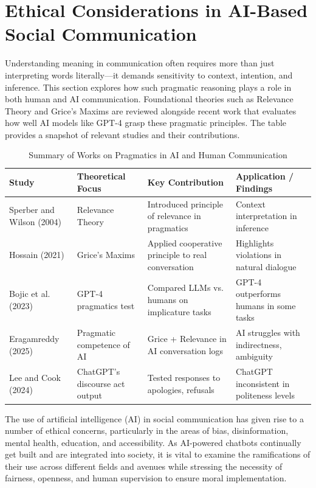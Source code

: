 \section{Ethical Considerations in AI-Based Social Communication}

Understanding meaning in communication often requires more than just interpreting words literally—it demands sensitivity to context, intention, and inference. This section explores how such pragmatic reasoning plays a role in both human and AI communication. Foundational theories such as Relevance Theory and Grice’s Maxims are reviewed alongside recent work that evaluates how well AI models like GPT-4 grasp these pragmatic principles. The table provides a snapshot of relevant studies and their contributions.

\begin{table}[H]
\centering
\caption{Summary of Works on Pragmatics in AI and Human Communication}
\small
\begin{tabular}{p{3.3cm} p{3.7cm} p{3.7cm} p{3.7cm}}
\toprule
\textbf{Study} & \textbf{Theoretical Focus} & \textbf{Key Contribution} & \textbf{Application / Findings} \\
\midrule
Sperber and Wilson (2004) & Relevance Theory & Introduced principle of relevance in pragmatics & Context interpretation in inference \\
Hossain (2021) & Grice's Maxims & Applied cooperative principle to real conversation & Highlights violations in natural dialogue \\
Bojic et al. (2023) & GPT-4 pragmatics test & Compared LLMs vs. humans on implicature tasks & GPT-4 outperforms humans in some tasks \\
Eragamreddy (2025) & Pragmatic competence of AI & Grice + Relevance in AI conversation logs & AI struggles with indirectness, ambiguity \\
Lee and Cook (2024) & ChatGPT’s discourse act output & Tested responses to apologies, refusals & ChatGPT inconsistent in politeness levels \\
\bottomrule
\end{tabular}
\end{table}

The use of artificial intelligence (AI) in social communication has given rise to a number of ethical concerns, particularly in the areas of bias, disinformation, mental health, education, and accessibility. As AI-powered chatbots continually get built and are integrated into society, it is vital to examine the ramifications of their use across different fields and avenues while stressing the necessity of fairness, openness, and human supervision to ensure moral implementation.

